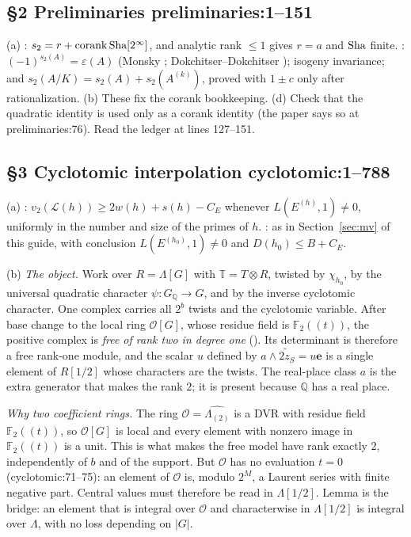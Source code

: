 \documentclass[11pt]{article}
\theoremstyle{remark}
\newcommand{\Q}{\mathbb Q}
\newcommand{\F}{\mathbb F}
\newcommand{\cO}{\mathcal O}
\newcommand{\cL}{\mathcal L}
\newcommand{\Sha}{\text{\rm Sha}}
\DeclareMathOperator{\corank}{corank}
\newcommand{\src}[2]{\textsf{\small #1:#2}}
\begin{document}
\subsection*{\S2 Preliminaries \hfill \src{preliminaries}{1--151}}
(a) : $s_2=r+\corank\Sha[2^\infty]$, and analytic rank $\le1$
gives $r=a$ and $\Sha$ finite. : $(-1)^{s_2(A)}=
\varepsilon(A)$ (Monsky \cite{Monsky1996}; Dokchitser--Dokchitser
\cite{DokchitserDokchitser2010}); isogeny invariance; and
$s_2(A/K)=s_2(A)+s_2(A^{(k)})$, proved with $1\pm c$ only after
rationalization.
(b) These fix the corank bookkeeping. (d) Check that the quadratic identity
is used only as a corank identity (the paper says so at
\src{preliminaries}{76}). Read the ledger at lines 127--151.

\subsection*{\S3 Cyclotomic interpolation \hfill \src{cyclotomic}{1--788}}
(a) : $v_2(\cL(h))\ge2w(h)+s(h)-C_E$ whenever
$L(E^{(h)},1)\ne0$, uniformly in the number and size of the primes of $h$.
: as in Section~\ref{sec:mv} of this guide, with conclusion
$L(E^{(h_0)},1)\ne0$ and $D(h_0)\le B+C_E$.

(b) \emph{The object.} Work over $R=\Lambda[G]$ with
$\mathbb T=T\otimes R$, twisted by $\chi_{h_0}$, by the universal quadratic
character $\psi:G_\Q\to G$, and by the inverse cyclotomic character. One
complex carries all $2^b$ twists and the cyclotomic variable. After base
change to the local ring $\cO[G]$, whose residue field is $\F_2((t))$, the
positive complex is \emph{free of rank two in degree one}
(). Its determinant is therefore a free rank-one module,
and the scalar $u$ defined by $a\wedge\widetilde{2z_S}=u\mathbf e$ is a
single element of $R[1/2]$ whose characters are the twists. The real-place
class $a$ is the extra generator that makes the rank $2$; it is present
because $\Q$ has a real place.

\emph{Why two coefficient rings.} The ring $\cO=\widehat{\Lambda_{(2)}}$ is a
DVR with residue field $\F_2((t))$, so $\cO[G]$ is local and every element
with nonzero image in $\F_2((t))$ is a unit. This is what makes the free
model have rank exactly $2$, independently of $b$ and of the support. But
$\cO$ has no evaluation $t=0$ (\src{cyclotomic}{71--75}): an element of
$\cO$ is, modulo $2^M$, a Laurent series with finite negative part. Central
values must therefore be read in $\Lambda[1/2]$. Lemma  is
the bridge: an element that is integral over $\cO$ and characterwise in
$\Lambda[1/2]$ is integral over $\Lambda$, with no loss depending on $|G|$.
\end{document}
